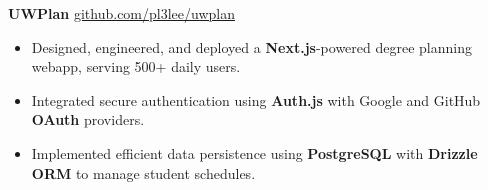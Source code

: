 \textbf{UWPlan} \hfill \href{https://github.com/pl3lee/uwplan}{github.com/pl3lee/uwplan} \\
\vspace{-9pt}
\begin{itemize}
  \item Designed, engineered, and deployed a \textbf{Next.js}-powered degree planning webapp, serving 500+ daily users.
  \item Integrated secure authentication using \textbf{Auth.js} with Google and GitHub \textbf{OAuth} providers.
  \item Implemented efficient data persistence using \textbf{PostgreSQL} with \textbf{Drizzle ORM} to manage student schedules.
\end{itemize}